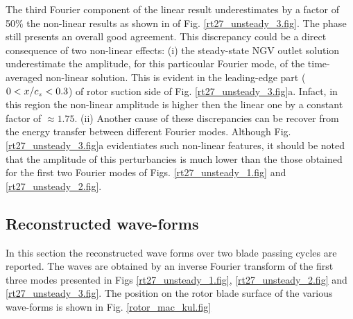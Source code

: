%
%
 The third Fourier component of the linear result underestimates
 by a factor of 50\% the non-linear results as shown in
 of Fig. \ref{rt27_unsteady_3.fig}. The phase still presents an overall
 good agreement.
 This discrepancy could be a direct consequence of two non-linear effects:
 (i) the steady-state NGV outlet solution underestimate the amplitude, for this
 particoular Fourier mode, of the time-averaged non-linear solution.
 This is evident in the leading-edge part ($0 < x/c_{\mbox{\tiny $x$}} < 0.3$)
 of rotor suction side of Fig. \ref{rt27_unsteady_3.fig}a.
 Infact, in this region the non-linear amplitude is higher then the linear
 one by a constant factor of $\approx 1.75$.
 (ii) Another cause of these discrepancies can be recover from the energy
 transfer between different Fourier modes.
 Although Fig. \ref{rt27_unsteady_3.fig}a evidentiates such non-linear
 features, it should be noted that the amplitude of this perturbancies
 is much lower than the those obtained for the first two Fourier modes
 of Figs. \ref{rt27_unsteady_1.fig} and \ref{rt27_unsteady_2.fig}.
%
%
%
\subsection{Reconstructed wave-forms}
%
 In this section the reconstructed wave forms over two blade passing cycles
 are reported. The waves are obtained by an inverse Fourier transform
 of the first three modes presented in Figs \ref{rt27_unsteady_1.fig},
 \ref{rt27_unsteady_2.fig} and \ref{rt27_unsteady_3.fig}.
 The position on the rotor blade surface of the various wave-forms
 is shown in Fig. \ref{rotor_mac_kul.fig}
%
%
